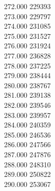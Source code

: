 { 272.000	229393 \\
 273.000	229797 \\
 274.000	231085 \\
 275.000	231527 \\
 276.000	231924 \\
 277.000	236828 \\
 278.000	237225 \\
 279.000	238444 \\
 280.000	238767 \\
 281.000	239138 \\
 282.000	239546 \\
 283.000	239957 \\
 284.000	240359 \\
 285.000	246536 \\
 286.000	247566 \\
 287.000	247876 \\
 288.000	248310 \\
 289.000	250822 \\
 290.000	253067 \\
}
